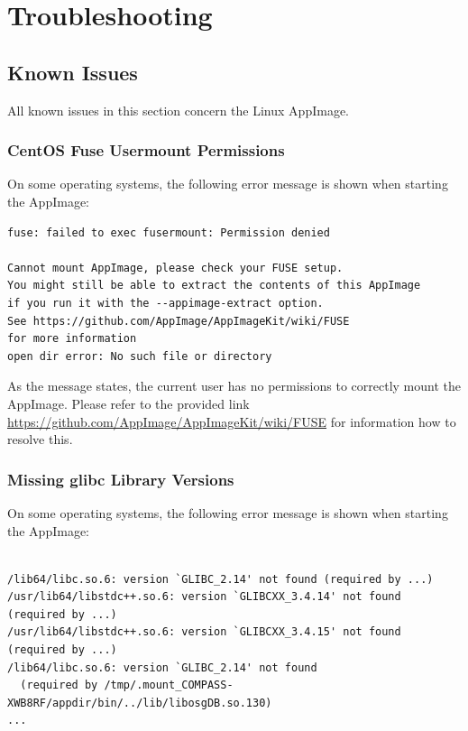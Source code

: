 \chapter{Troubleshooting}
\label{sec:troubleshooting}

\section{Known Issues}

All known issues in this section concern the Linux AppImage. \\

\subsection{CentOS Fuse Usermount Permissions}

On some operating systems, the following error message is shown when starting the AppImage:

\begin{verbatim}
fuse: failed to exec fusermount: Permission denied

Cannot mount AppImage, please check your FUSE setup.
You might still be able to extract the contents of this AppImage 
if you run it with the --appimage-extract option. 
See https://github.com/AppImage/AppImageKit/wiki/FUSE 
for more information
open dir error: No such file or directory
\end{verbatim}


As the message states, the current user has no permissions to correctly mount the AppImage. Please refer to the provided link \url{https://github.com/AppImage/AppImageKit/wiki/FUSE} for information how to resolve this.

\subsection{Missing glibc Library Versions}

On some operating systems, the following error message is shown when starting the AppImage:\\\\

\begin{verbatim}
/lib64/libc.so.6: version `GLIBC_2.14' not found (required by ...)
/usr/lib64/libstdc++.so.6: version `GLIBCXX_3.4.14' not found (required by ...)
/usr/lib64/libstdc++.so.6: version `GLIBCXX_3.4.15' not found (required by ...)
/lib64/libc.so.6: version `GLIBC_2.14' not found 
  (required by /tmp/.mount_COMPASS-XWB8RF/appdir/bin/../lib/libosgDB.so.130)
...
\end{verbatim}

